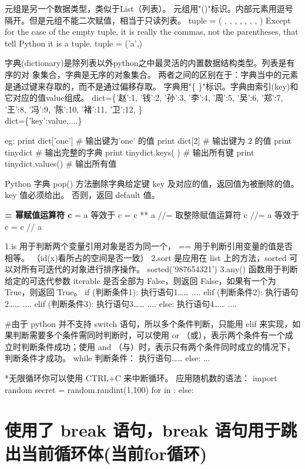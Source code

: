 \documentclass[11pt]{article}
\begin{document}
元组是另一个数据类型，类似于List（列表）。
元组用"()"标识。内部元素用逗号隔开。但是元组不能二次赋值，相当于只读列表。
tuple = ( , , , , , , , ) Except for the case of the empty tuple, it is
really the commas, not the parentheses, that tell Python it is a tuple.
tuple = ('a',)

字典(dictionary)是除列表以外python之中最灵活的内置数据结构类型。列表是有序的对
象集合，字典是无序的对象集合。
两者之间的区别在于：字典当中的元素是通过键来存取的，而不是通过偏移存取。
字典用"\{ \}"标识。字典由索引(key)和它对应的值value组成。 dict=\{'赵':1,
'钱':2, '孙':3, '李':4, '周':5, '吴':6, '郑':7, '王':8, '冯':9, '陈':10,
'褚':11, '卫':12, \}\\
dict=\{'key':value,....\}

eg: print dict{[}'one'{]} \# 输出键为'one' 的值 print dict{[}2{]} \#
输出键为 2 的值 print tinydict \# 输出完整的字典 print tinydict.keys( )
\# 输出所有键 print tinydict.values() \# 输出所有值

Python 字典 pop() 方法删除字典给定键 key
及对应的值，返回值为被删除的值。key 值必须给出。 否则，返回 default 值。

    \textbf{= 幂赋值运算符 c }= a 等效于 c = c ** a //= 取整除赋值运算符 c
//= a 等效于 c = c // a

    1.is 用于判断两个变量引用对象是否为同一个， ==
用于判断引用变量的值是否相等。 （id(x)看所占的空间是否一致） 2.sort
是应用在 list 上的方法，sorted 可以对所有可迭代的对象进行排序操作。
sorted('987654321') 3.any() 函数用于判断给定的可迭代参数 iterable
是否全部为 False，则返回 False，如果有一个为 True，则返回 True。 
if (判断条件1):
    执行语句1……
    ....
elif (判断条件2):
    执行语句2……
    ....
elif (判断条件3):
    执行语句3……
    ....
else:
    执行语句4……
    ....
    
   #由于 python 并不支持 switch 语句，所以多个条件判断，只能用 elif 来实现，如果判断需要多个条件需同时判断时，可以使用 or （或），表示两个条件有一个成立时判断条件成功；使用 and （与）时，表示只有两个条件同时成立的情况下，判断条件才成功。 
    while 判断条件： 执行语句\ldots{}\ldots{} else: ...

*无限循环你可以使用 CTRL+C 来中断循环。
应用随机数的语法：
    import random
    secret = random.randint(1,100)
    for in : else:

\section{使用了 break 语句，break
语句用于跳出当前循环体(当前for循环)}\label{ux4f7fux7528ux4e86-break-ux8bedux53e5break-ux8bedux53e5ux7528ux4e8eux8df3ux51faux5f53ux524dux5faaux73afux4f53ux5f53ux524dforux5faaux73af}
\end{document}
